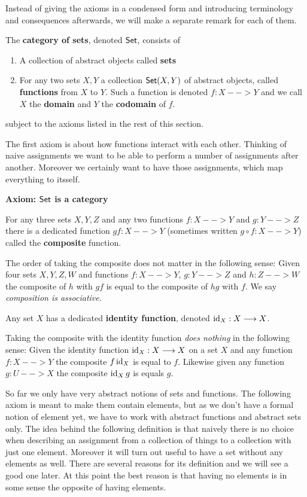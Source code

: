 	Instead of giving the axioms in a condensed form and introducing terminology and consequences afterwards, we will make a separate remark for each of them.

	\begin{definition}
		The \textbf{category of sets}, denoted $\textsf{Set}$, consists of
		\begin{enumerate}[$\bullet$]
			\item{
				A collection of abstract objects called \textbf{sets}
			}
			\item{
				For any two sets $X,Y$ a collection $\textsf{Set}(X,Y)$ of abstract objects, called \textbf{functions} from $X$ to $Y$. Such a function is denoted $f:X-->Y$ and we call $X$ the \textbf{domain} and $Y$ the \textbf{codomain} of $f$.
			}
		\end{enumerate}
		subject to the axioms listed in the rest of this section.
	\end{definition}

	The first axiom is about how functions interact with each other. Thinking of naive assignments we want to be able to perform a number of assignments after another. Moreover we certainly want to have those assignments, which map everything to itsself.

	\begin{mdframed}[skipabove=1em,skipbelow=1em]
		\textbf{Axiom: $\textsf{Set}$ is a category}

		For any three sets $X,Y,Z$ and any two functions $f:X-->Y$ and $g:Y-->Z$ there is a dedicated function $gf:X-->Y$ (sometimes written $g\circ f:X-->Y$) called the \textbf{composite} function.
	
		The order of taking the composite does not matter in the following sense: Given four sets $X,Y,Z,W$ and functions $f:X-->Y$, $g:Y-->Z$ and $h:Z-->W$ the composite of $h$ with $gf$ is equal to the composite of $hg$ with $f$. We say \textit{composition is associative}.
	
		Any set $X$ has a dedicated \textbf{identity function}, denoted $\operatorname{id}_X: X --> X$.

		Taking the composite with the identity function \textit{does nothing} in the following sense: Given the identity function $\operatorname{id}_X:X-->X$ on a set $X$ and any function $f:X-->Y$ the composite $f\operatorname{id}_X$ is equal to $f$. Likewise given any function $g:U-->X$ the composite $\operatorname{id}_Xg$ is equals $g$.
	\end{mdframed}

	So far we only have very abstract notions of sets and functions. The following axiom is meant to make them contain elements, but as we don't have a formal notion of element yet, we have to work with abstract functions and abstract sets only. The idea behind the following definition is that naively there is no choice when describing an assignment from a collection of things to a collection with just one element. 
	Moreover it will turn out useful to have a set without any elements as well. There are several reasons for its definition and we will see a good one later. At this point the best reason is that having no elements is in some sense the opposite of having elements. 

